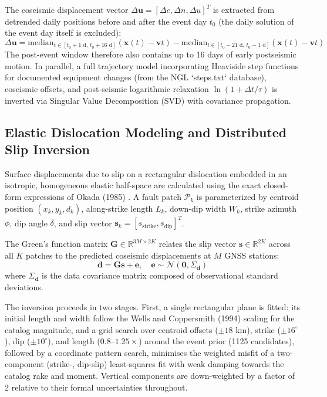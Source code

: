 \documentclass[11pt,a4paper]{article}
\begin{document}
The coseismic displacement vector $\Delta \mathbf{u} = [\Delta e, \Delta n, \Delta u]^T$ is extracted from detrended daily positions before and after the event day $t_0$ (the daily solution of the event day itself is excluded):
\begin{equation}
\Delta \mathbf{u} = \text{median}_{t \in [t_0 + 1\text{ d},\, t_0 + 16\text{ d}]} (\mathbf{x}(t) - \mathbf{v}t) - \text{median}_{t \in [t_0 - 21\text{ d},\, t_0 - 1\text{ d}]} (\mathbf{x}(t) - \mathbf{v}t)
\end{equation}
The post-event window therefore also contains up to 16 days of early postseismic motion.
In parallel, a full trajectory model incorporating Heaviside step functions for documented equipment changes (from the NGL `steps.txt` database), coseismic offsets, and post-seismic logarithmic relaxation $\ln(1 + \Delta t / \tau)$ is inverted via Singular Value Decomposition (SVD) with covariance propagation.

\subsection{Elastic Dislocation Modeling and Distributed Slip Inversion}
Surface displacements due to slip on a rectangular dislocation embedded in an isotropic, homogeneous elastic half-space are calculated using the exact closed-form expressions of Okada (1985) \cite{okada1985}. A fault patch $\mathcal{P}_k$ is parameterized by centroid position $(x_k, y_k, d_k)$, along-strike length $L_k$, down-dip width $W_k$, strike azimuth $\phi$, dip angle $\delta$, and slip vector $\mathbf{s}_k = [s_{\text{strike}}, s_{\text{dip}}]^T$.

The Green's function matrix $\mathbf{G} \in \mathbb{R}^{3M \times 2K}$ relates the slip vector $\mathbf{s} \in \mathbb{R}^{2K}$ across all $K$ patches to the predicted coseismic displacements at $M$ GNSS stations:
\begin{equation}
\mathbf{d} = \mathbf{G}\mathbf{s} + \mathbf{e}, \quad \mathbf{e} \sim \mathcal{N}(\mathbf{0}, \Sigma_{\mathbf{d}})
\end{equation}
where $\Sigma_{\mathbf{d}}$ is the data covariance matrix composed of observational standard deviations.

The inversion proceeds in two stages. First, a single rectangular plane is fitted: its initial length and width follow the Wells and Coppersmith (1994) \cite{wells1994} scaling for the catalog magnitude, and a grid search over centroid offsets ($\pm 18\text{ km}$), strike ($\pm 16^\circ$), dip ($\pm 10^\circ$), and length ($0.8$--$1.25\times$) around the event prior (1125 candidates), followed by a coordinate pattern search, minimises the weighted misfit of a two-component (strike-, dip-slip) least-squares fit with weak damping towards the catalog rake and moment. Vertical components are down-weighted by a factor of 2 relative to their formal uncertainties throughout.
\end{document}
